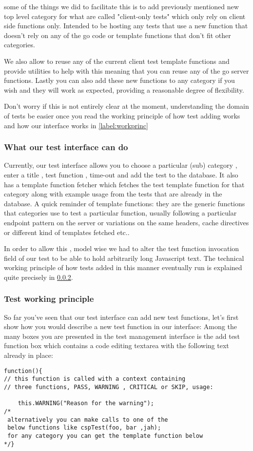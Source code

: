 some of the things we did to facilitate this is to add previously mentioned new top level category for what are called "client-only tests"
which only rely on client side functions only. Intended to be hosting any tests that use a new function that doesn't rely on any of the go code
or template functions that don't fit other categories.

We also allow to reuse any of the current client test template functions and provide utilities to help with this meaning
that you can reuse any of the go server functions. Lastly you can also add these new functions to any category if you wish and they will work
as expected, providing a reasonable degree of flexibility.

Don't worry if this is not entirely clear at the moment,  understanding  the domain of tests be easier once you read the
working principle of how test adding works and how our interface works in \ref{label:workprinc}

\subsubsection{What our test interface can do}

Currently, our test interface allows you to choose a particular (sub) category , enter a title , test function , time-out and add the test to the database.
It also has a template function fetcher which fetches the test template function for that category along with example usage from the tests that are already in the database.
A quick reminder of template functions: they are the generic functions that categories use to test a particular function, usually following a particular
endpoint pattern on the server or variations on the same headers, cache directives or different kind of templates fetched etc..

In order to allow this , model wise we had to alter the test function invocation field of our test to be able to hold arbitrarily long Javascript text.
The technical working principle of how tests added in this manner eventually run is explained quite precisely in \ref{subsec:princ}. 

\subsubsection{Test working principle}
\label{subsec:princ}

So far you've seen that our test interface can add new test functions, let's first show how you would describe a new test function in our interface:
Among the many boxes you are presented in the test management interface is the add test function box which contains a code editing textarea with the following
text already in place:
\begin{verbatim}
function(){
// this function is called with a context containing
// three functions, PASS, WARNING , CRITICAL or SKIP, usage:

	this.WARNING("Reason for the warning");
/*
 alternatively you can make calls to one of the 
 below functions like cspTest(foo, bar ,jah); 
 for any category you can get the template function below
*/} 
\end{verbatim}


